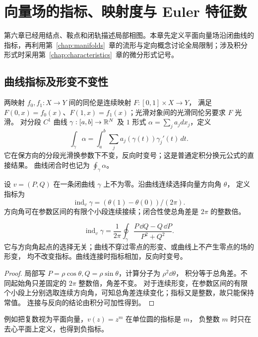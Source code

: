 \chapter{向量场的指标、映射度与 Euler 特征数}\label{chap:indices}

第六章已经用结点、鞍点和闭轨描述局部相图。本章先定义平面向量场沿闭曲线的指标，再利用第~\ref{chap:manifolds}~章的流形与定向概念讨论全局限制；涉及积分形式时采用第~\ref{chap:characteristics}~章的微分形式记号。

\section{曲线指标及形变不变性}


\begin{definition}[同伦与曲线积分]\label{def:homotopy-line-integral}
两映射 $f_0,f_1:X\to Y$ 间的同伦是连续映射 $F:[0,1]\times X\to Y$，
满足 $F(0,x)=f_0(x)$、$F(1,x)=f_1(x)$；光滑对象间的光滑同伦另要求 $F$ 光滑。
对分段 $C^1$ 曲线 $\gamma:[a,b]\to\mathbb{R}^N$ 及 $1$ 形式 $\alpha=\sum_j a_jdx_j$，定义
\[
 \int_\gamma\alpha=\int_a^b\sum_j a_j(\gamma(t))\gamma_j'(t)\,dt.
\]
它在保方向的分段光滑换参数下不变，反向时变号；这是普通定积分换元公式的直接结果。
曲线闭合时也记为 $\displaystyle\oint_\gamma\alpha$。
\end{definition}
\begin{definition}
设 $v=(P,Q)$ 在一条闭曲线 $\gamma$ 上不为零。沿曲线连续选择向量方向角 $\theta$，
定义指标为 
\[
 \operatorname{ind}_v\gamma=(\theta(1)-\theta(0))/(2\pi).
\]
方向角可在参数区间的有限个小段连续接续；闭合性使总角差是 $2\pi$ 的整数倍。
\end{definition}
\begin{proposition}
\[
 \operatorname{ind}_v\gamma=
 \frac1{2\pi}\oint_\gamma\frac{P\,\dd Q-Q\,\dd P}{P^2+Q^2}.
\]
它与方向角起点的选择无关；曲线不穿过零点的形变、或曲线上不产生零点的场的形变，
均不改变指标。曲线连接时指标相加，反向时变号。
\end{proposition}
\begin{proof}
局部写 $P=\rho\cos\theta,Q=\rho\sin\theta$，计算分子为 $\rho^2\dd\theta$，
积分等于总角差。不同起始角只差固定的 $2\pi$ 整数倍，角差不变。
对于连续形变，在参数区间的有限个小段上分别选取连续方向角，可知总角差连续变化；指标又是整数，故只能保持常值。
连接与反向的结论由积分可加性得到。
\end{proof}
例如把复数视为平面向量，$v(z)=z^m$ 在单位圆的指标是 $m$，
负整数 $m$ 时只在去心平面上定义，也得到负指标。

